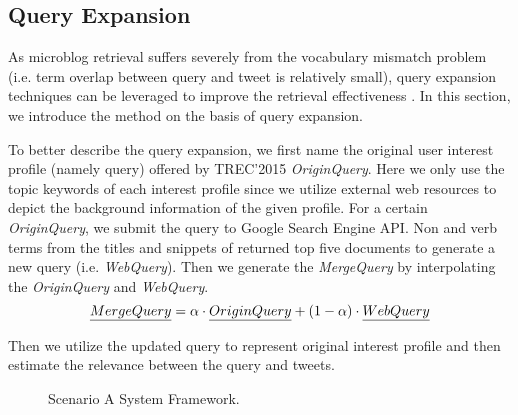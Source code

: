 \subsection{Query Expansion}
As microblog retrieval suffers severely from the vocabulary mismatch problem
(i.e. term overlap between query and tweet is relatively small),
query expansion techniques can be leveraged to improve the retrieval effectiveness \cite{zhai2011mbfb}.
In this section, we introduce the method on the basis of query expansion.

To better describe the query expansion, 
we first name the original user interest profile (namely query) offered by TREC'2015 \emph{OriginQuery}.
Here we only use the topic keywords of each interest profile since we utilize external web resources to depict the background information of the given profile.
For a certain \emph{OriginQuery},
we submit the query to Google Search Engine API. 
Non and verb terms from the titles and snippets of returned top five documents to generate a new query (i.e. \emph{WebQuery}). 
Then we generate the \emph{MergeQuery} by interpolating the \emph{OriginQuery} and \emph{WebQuery}.
\begin{equation}
\label{equ:merge}
\emph{MergeQuery} = \alpha \cdot \emph{OriginQuery} + (1-\alpha) \cdot \emph{WebQuery}
\end{equation}

Then we utilize the updated query to represent original interest profile and then estimate the relevance between the query and tweets.
\begin{figure}[htbp]
\centering
{
}
\caption{Scenario A System Framework.}
\label{fig:Asys}
\end{figure}
